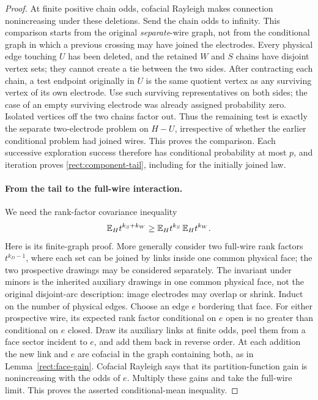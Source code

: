 \begin{proof}
At finite positive chain odds, cofacial Rayleigh makes connection
nonincreasing under these deletions.  Send the chain odds to infinity.
This comparison starts from the original \emph{separate}-wire graph,
not from the conditional graph in which a previous crossing may have
joined the electrodes.  Every physical edge touching $U$ has been
deleted, and the retained $W$ and $S$ chains have disjoint vertex sets;
they cannot create a tie between the two sides.  After contracting
each chain, a test endpoint originally in $U$ is the same quotient
vertex as any surviving vertex of its own electrode.  Use such
surviving representatives on both sides; the case of an empty surviving
electrode was already assigned probability zero.  Isolated vertices
off the two chains factor out.  Thus the remaining test is exactly the
separate two-electrode problem on $H-U$, irrespective of whether the
earlier conditional problem had joined wires.
This proves the comparison.  Each successive exploration success
therefore has conditional probability at most $p$, and iteration
proves \eqref{rect:component-tail}, including for the initially
joined law.

\paragraph{From the tail to the full-wire interaction.}
We need the rank-factor covariance inequality
\begin{equation}
 \mathbb E_H t^{k_S+k_W}\ge
 \mathbb E_H t^{k_S}\,\mathbb E_H t^{k_W}.
 \label{rect:rank-covariance}
\end{equation}
Here is its finite-graph proof.  More generally consider two full-wire
rank factors $t^{k_D-1}$, where each set can be joined by links inside
one common physical face; the two prospective drawings may be
considered separately.  The invariant under minors is the inherited
auxiliary drawings in one common physical face, not the original
disjoint-arc description: image electrodes may overlap or shrink.
Induct on the number of physical edges.
Choose an edge $e$ bordering that face.  For either prospective wire,
its expected rank factor conditional on $e$ open is no greater than
conditional on $e$ closed.  Draw its auxiliary links at finite odds,
peel them from a face sector incident to $e$, and add them back in
reverse order.  At each addition the new link and $e$ are cofacial in
the graph containing both, as in Lemma~\ref{rect:face-gain}.
Cofacial Rayleigh says that its
partition-function gain is nonincreasing with the odds of $e$.
Multiply these gains and take the full-wire limit.  This proves the
asserted conditional-mean inequality.


\end{proof}
